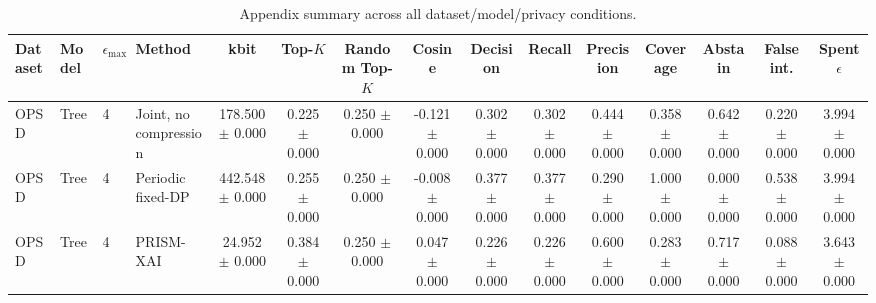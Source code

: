 \begin{table}[t]
\caption{Appendix summary across all dataset/model/privacy conditions.}
\label{tab:appendix-conditions}
\centering
\scriptsize
\setlength{\tabcolsep}{2.5pt}
\begin{tabular}{llllccccccccccc}
\toprule
Dataset & Model & $\epsilon_{\max}$ & Method & kbit & Top-$K$ & Random Top-$K$ & Cosine & Decision & Recall & Precision & Coverage & Abstain & False int. & Spent $\epsilon$ \\
\midrule
OPSD & Tree & 4 & Joint, no compression & 178.500 $\pm$ 0.000 & 0.225 $\pm$ 0.000 & 0.250 $\pm$ 0.000 & -0.121 $\pm$ 0.000 & 0.302 $\pm$ 0.000 & 0.302 $\pm$ 0.000 & 0.444 $\pm$ 0.000 & 0.358 $\pm$ 0.000 & 0.642 $\pm$ 0.000 & 0.220 $\pm$ 0.000 & 3.994 $\pm$ 0.000 \\
OPSD & Tree & 4 & Periodic fixed-DP & 442.548 $\pm$ 0.000 & 0.255 $\pm$ 0.000 & 0.250 $\pm$ 0.000 & -0.008 $\pm$ 0.000 & 0.377 $\pm$ 0.000 & 0.377 $\pm$ 0.000 & 0.290 $\pm$ 0.000 & 1.000 $\pm$ 0.000 & 0.000 $\pm$ 0.000 & 0.538 $\pm$ 0.000 & 3.994 $\pm$ 0.000 \\
OPSD & Tree & 4 & PRISM-XAI & 24.952 $\pm$ 0.000 & 0.384 $\pm$ 0.000 & 0.250 $\pm$ 0.000 & 0.047 $\pm$ 0.000 & 0.226 $\pm$ 0.000 & 0.226 $\pm$ 0.000 & 0.600 $\pm$ 0.000 & 0.283 $\pm$ 0.000 & 0.717 $\pm$ 0.000 & 0.088 $\pm$ 0.000 & 3.643 $\pm$ 0.000 \\
\bottomrule
\end{tabular}
\end{table}
